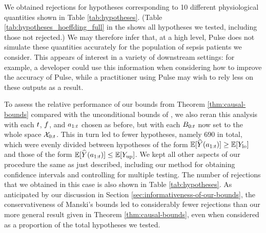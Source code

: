 
We obtained rejections for hypotheses corresponding to 10 different physiological quantities shown in Table \ref{tab:hypotheses}.
(Table \ref{tab:hypotheses_hoeffding_full} in the \AppendixName shows all hypotheses we tested, including those not rejected.)
We may therefore infer that, at a high level, Pulse does not simulate these quantities accurately for the population of sepsis patients we consider.
This appears of interest in a variety of downstream settings: for example, a developer could use this information when considering how to improve the accuracy of Pulse, while a practitioner using Pulse may wish to rely less on these outputs as a result.


To assess the relative performance of our bounds from Theorem \ref{thm:causal-bounds} compared with the unconditional bounds of \citet{manski}, we also reran this analysis with each $t$, $f$, and $a_{1:t}$ chosen as before, but with each $B_{0:t}$ now set to the whole space $\mathcal{X}_{0:t}$.
This in turn led to fewer hypotheses, namely 690 in total, which were evenly divided between hypotheses of the form $\mathbb{E}[\widehat{Y}(a_{1:t})] \geq \mathbb{E}[Y_{\mathrm{lo}}]$ and those of the form $\mathbb{E}[\widehat{Y}(a_{1:t})] \leq \mathbb{E}[Y_{\mathrm{up}}]$.
We kept all other aspects of our procedure the same as just described, including our method for obtaining confidence intervals and controlling for multiple testing.
The number of rejections that we obtained in this case is also shown in Table \ref{tab:hypotheses}.
As anticipated by our discussion in Section \ref{sec:informativeness-of-our-bounds}, the conservativeness of Manski's bounds led to considerably fewer rejections than our more general result given in Theorem \ref{thm:causal-bounds}, even when considered as a proportion of the total hypotheses we tested.

